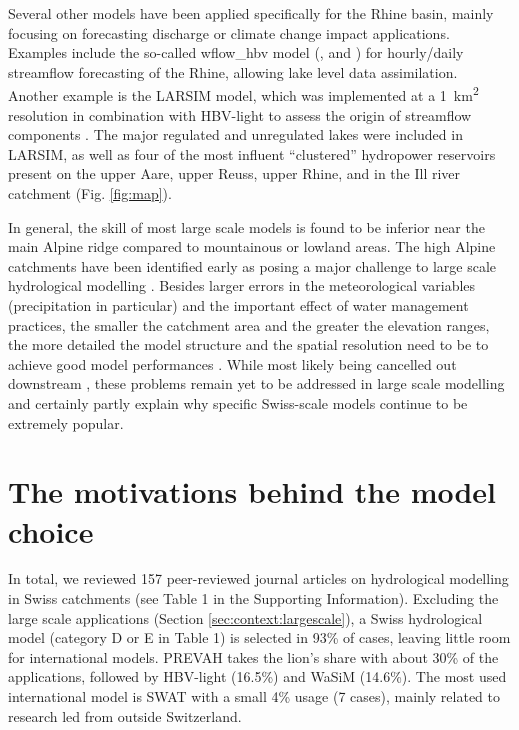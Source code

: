 \documentclass[10pt,a4paper]{article}
\begin{document}
Several other models have been applied specifically for the Rhine basin, mainly focusing on forecasting discharge or climate change impact applications. Examples include the so-called wflow\_hbv model (\citealp{vanOsnabrugge2017}, \citealp{vanOsnabrugge2019} and \citealt{vanOsnabrugge2020}) for hourly/daily streamflow forecasting of the Rhine, allowing lake level data assimilation. Another example is the LARSIM model, which was implemented at a 1~km\textsuperscript{2} resolution in combination with HBV-light to assess the origin of streamflow components \citep{Stahl2017}. The major regulated and unregulated lakes were included in LARSIM, as well as four of the most influent ``clustered'' hydropower reservoirs present on the upper Aare, upper Reuss, upper Rhine, and in the Ill river catchment (Fig. \ref{fig:map}).

In general, the skill of most large scale models is found to be inferior near the main Alpine ridge compared to mountainous or lowland areas. The high Alpine catchments have been identified early as posing a major challenge to large scale hydrological modelling \citep{Kleinn2005}.  Besides larger errors in the meteorological variables (precipitation in particular) and the important effect of water management practices, the smaller the catchment area and the greater the elevation ranges, the more detailed the model structure and the spatial resolution need to be to achieve good model performances \citep{Gurtz2003}. While most likely being cancelled out downstream \citep{Kleinn2005}, these problems remain yet to be addressed in large scale modelling and certainly partly explain why specific Swiss-scale models continue to be extremely popular. 


\section{The motivations behind the model choice}
\label{sec:motivations}

In total, we reviewed 157 peer-reviewed journal articles on hydrological modelling in Swiss catchments (see Table 1 in the Supporting Information). Excluding the large scale applications (Section \ref{sec:context:largescale}), a Swiss hydrological model (category D or E in Table 1) is selected in 93\% of cases, leaving little room for international models. PREVAH takes the lion's share with about 30\% of the applications, followed by HBV-light (16.5\%) and WaSiM (14.6\%). The most used international model is SWAT with a small 4\% usage (7 cases), mainly related to research led from outside Switzerland.
\end{document}
